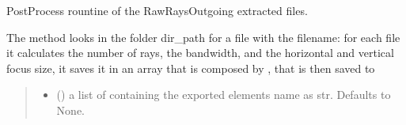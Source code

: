 \documentclass[letterpaper,10pt,english]{sphinxmanual}
\begin{document}
\begin{fulllineitems}
\begin{fulllineitems}
\label{\detokenize{code_documentation:raypyng.postprocessing.PostProcess.postprocess_RawRays}}
\pysigstartsignatures
{}
\pysigstopsignatures
\sphinxAtStartPar
PostProcess rountine of the RawRaysOutgoing extracted files.

\sphinxAtStartPar
The method looks in the folder dir\_path for a file with the filename:
for each file it calculates the number of rays, the bandwidth, and the horizontal and vertical focus size,
it saves it in an array that is composed by , that is then saved to
\begin{quote}\begin{description}
\begin{itemize}
\item {} 
\sphinxAtStartPar
{} (\sphinxstyleliteralemphasis{\sphinxupquote{, }}) \textendash{} a list of containing the exported elements name as str. Defaults to None.


\end{itemize}
\end{description}
\end{quote}
\end{fulllineitems}
\end{fulllineitems}
\end{document}
